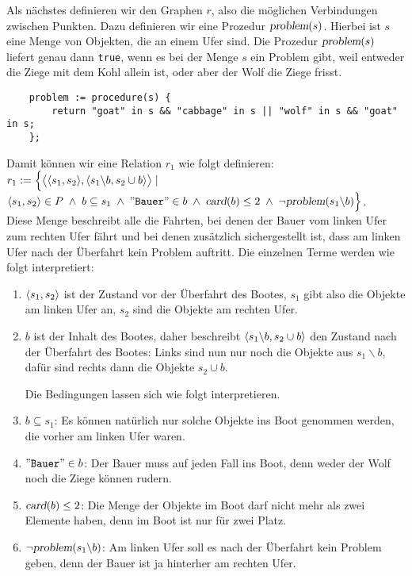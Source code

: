 Als n\"{a}chstes definieren wir den Graphen $r$, also die m\"{o}glichen Verbindungen zwischen
Punkten.  Dazu definieren wir eine Prozedur $\textsl{problem}(s)$. Hierbei ist $s$ eine
Menge von Objekten, die an einem Ufer sind.  Die Prozedur $\textsl{problem}(s)$
liefert genau dann \texttt{true}, wenn es bei der  Menge $s$ ein Problem gibt, weil entweder die Ziege
mit dem Kohl allein ist, oder aber der Wolf die Ziege frisst.
\begin{verbatim}
    problem := procedure(s) {
        return "goat" in s && "cabbage" in s || "wolf" in s && "goat" in s;
    };
\end{verbatim}
Damit k\"{o}nnen wir eine Relation $r_1$ wie folgt definieren:
\\[0.2cm]
\hspace*{1.3cm} 
$r_1 := \Bigl\{ \bigl\langle \pair(s_1, s_2), \pair(s_1 \backslash b, s_2 \cup b)
  \bigr\rangle \;|\; $ \\
\hspace*{2.3cm} 
$\pair(s_1, s_2) \in P \;\wedge\; b \subseteq s_1 \;\wedge\;
 \squote{Bauer} \in b \;\wedge\; \textsl{card}(b) \leq 2 \;\wedge\; \neg\textsl{problem}(s_1 \backslash b) \Bigr\}$.
\\[0.2cm]
Diese Menge beschreibt alle die Fahrten, bei denen der Bauer vom linken Ufer zum rechten Ufer
f\"{a}hrt und bei denen zus\"{a}tzlich sichergestellt ist, dass am linken Ufer
nach der Überfahrt kein Problem auftritt.  Die einzelnen Terme werden wie folgt
interpretiert:
\begin{enumerate}
\item $\pair(s_1,s_2)$ ist der Zustand vor der Überfahrt des Bootes,
      $s_1$ gibt also die Objekte am linken Ufer an, $s_2$ sind die Objekte am rechten Ufer.
\item $b$ ist der Inhalt des Bootes, daher beschreibt 
       $\pair(s_1 \backslash b, s_2 \cup b)$ den Zustand nach der Überfahrt des Bootes:
       Links sind nun nur noch die Objekte aus $s_1 \backslash b$, daf\"{u}r sind rechts dann 
       die Objekte $s_2 \cup b$.

       Die Bedingungen lassen sich wie folgt interpretieren.
\item $b \subseteq s_1$: Es k\"{o}nnen nat\"{u}rlich nur solche Objekte ins Boot genommen werden,
       die vorher am linken Ufer waren.
\item $\squote{Bauer} \in b$: Der Bauer muss auf jeden Fall ins Boot, denn weder der Wolf
       noch die Ziege k\"{o}nnen rudern.
\item $\textsl{card}(b) \leq 2$: Die Menge der Objekte im Boot darf nicht mehr als zwei
       Elemente haben, denn im Boot ist nur f\"{u}r zwei Platz.
\item $\neg\textsl{problem}(s_1 \backslash b)$:  Am linken Ufer soll es nach der Überfahrt
       kein Problem geben, denn der Bauer ist ja hinterher am rechten Ufer.
\end{enumerate}
